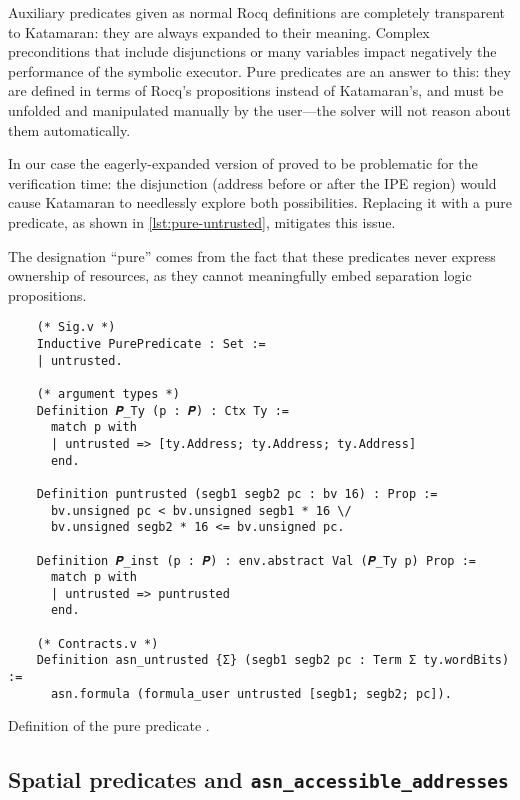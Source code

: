 Auxiliary predicates given as normal Rocq definitions are completely transparent to Katamaran: they are always expanded to their meaning. Complex preconditions that include disjunctions or many variables impact negatively the performance of the symbolic executor. Pure predicates are an answer to this: they are defined in terms of Rocq's propositions instead of Katamaran's, and must be unfolded and manipulated manually by the user---the solver will not reason about them automatically. %

In our case the eagerly-expanded version of  proved to be problematic for the verification time: the disjunction (address before or after the IPE region) would cause Katamaran to needlessly explore both possibilities. Replacing it with a pure predicate, as shown in \cref{lst:pure-untrusted}, mitigates this issue.

The designation ``pure'' comes from the fact that these predicates never express ownership of resources, as they cannot meaningfully embed separation logic propositions.

\begin{listing}[htb]
  \begin{verbatim}
    (* Sig.v *)
    Inductive PurePredicate : Set :=
    | untrusted.

    (* argument types *)
    Definition 𝑷_Ty (p : 𝑷) : Ctx Ty :=
      match p with
      | untrusted => [ty.Address; ty.Address; ty.Address]
      end.

    Definition puntrusted (segb1 segb2 pc : bv 16) : Prop :=
      bv.unsigned pc < bv.unsigned segb1 * 16 \/
      bv.unsigned segb2 * 16 <= bv.unsigned pc.

    Definition 𝑷_inst (p : 𝑷) : env.abstract Val (𝑷_Ty p) Prop :=
      match p with
      | untrusted => puntrusted
      end.

    (* Contracts.v *)
    Definition asn_untrusted {Σ} (segb1 segb2 pc : Term Σ ty.wordBits) :=
      asn.formula (formula_user untrusted [segb1; segb2; pc]).
  \end{verbatim}
  \caption{Definition of the pure predicate .}
  \label{lst:pure-untrusted}
\end{listing}

\subsection{Spatial predicates and \texttt{asn\_accessible\_addresses}}
\label{sec:spatial-preds}

